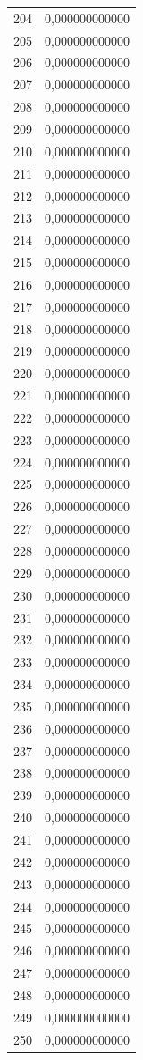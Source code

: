 \begin{tabular}{lr}
204 & 0,000000000000 \\
205 & 0,000000000000 \\
206 & 0,000000000000 \\
207 & 0,000000000000 \\
208 & 0,000000000000 \\
209 & 0,000000000000 \\
210 & 0,000000000000 \\
211 & 0,000000000000 \\
212 & 0,000000000000 \\
213 & 0,000000000000 \\
214 & 0,000000000000 \\
215 & 0,000000000000 \\
216 & 0,000000000000 \\
217 & 0,000000000000 \\
218 & 0,000000000000 \\
219 & 0,000000000000 \\
220 & 0,000000000000 \\
221 & 0,000000000000 \\
222 & 0,000000000000 \\
223 & 0,000000000000 \\
224 & 0,000000000000 \\
225 & 0,000000000000 \\
226 & 0,000000000000 \\
227 & 0,000000000000 \\
228 & 0,000000000000 \\
229 & 0,000000000000 \\
230 & 0,000000000000 \\
231 & 0,000000000000 \\
232 & 0,000000000000 \\
233 & 0,000000000000 \\
234 & 0,000000000000 \\
235 & 0,000000000000 \\
236 & 0,000000000000 \\
237 & 0,000000000000 \\
238 & 0,000000000000 \\
239 & 0,000000000000 \\
240 & 0,000000000000 \\
241 & 0,000000000000 \\
242 & 0,000000000000 \\
243 & 0,000000000000 \\
244 & 0,000000000000 \\
245 & 0,000000000000 \\
246 & 0,000000000000 \\
247 & 0,000000000000 \\
248 & 0,000000000000 \\
249 & 0,000000000000 \\
250 & 0,000000000000 \\
\bottomrule
\end{tabular}
